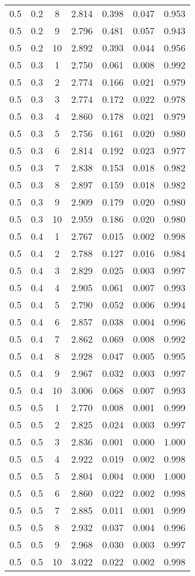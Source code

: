 \begin{tabular}{|c|c|c|c|c|c|c|}
0.5 & 0.2 & 8 & 2.814 & 0.398 & 0.047 & 0.953 \\
0.5 & 0.2 & 9 & 2.796 & 0.481 & 0.057 & 0.943 \\
0.5 & 0.2 & 10 & 2.892 & 0.393 & 0.044 & 0.956 \\
0.5 & 0.3 & 1 & 2.750 & 0.061 & 0.008 & 0.992 \\
0.5 & 0.3 & 2 & 2.774 & 0.166 & 0.021 & 0.979 \\
0.5 & 0.3 & 3 & 2.774 & 0.172 & 0.022 & 0.978 \\
0.5 & 0.3 & 4 & 2.860 & 0.178 & 0.021 & 0.979 \\
0.5 & 0.3 & 5 & 2.756 & 0.161 & 0.020 & 0.980 \\
0.5 & 0.3 & 6 & 2.814 & 0.192 & 0.023 & 0.977 \\
0.5 & 0.3 & 7 & 2.838 & 0.153 & 0.018 & 0.982 \\
0.5 & 0.3 & 8 & 2.897 & 0.159 & 0.018 & 0.982 \\
0.5 & 0.3 & 9 & 2.909 & 0.179 & 0.020 & 0.980 \\
0.5 & 0.3 & 10 & 2.959 & 0.186 & 0.020 & 0.980 \\
0.5 & 0.4 & 1 & 2.767 & 0.015 & 0.002 & 0.998 \\
0.5 & 0.4 & 2 & 2.788 & 0.127 & 0.016 & 0.984 \\
0.5 & 0.4 & 3 & 2.829 & 0.025 & 0.003 & 0.997 \\
0.5 & 0.4 & 4 & 2.905 & 0.061 & 0.007 & 0.993 \\
0.5 & 0.4 & 5 & 2.790 & 0.052 & 0.006 & 0.994 \\
0.5 & 0.4 & 6 & 2.857 & 0.038 & 0.004 & 0.996 \\
0.5 & 0.4 & 7 & 2.862 & 0.069 & 0.008 & 0.992 \\
0.5 & 0.4 & 8 & 2.928 & 0.047 & 0.005 & 0.995 \\
0.5 & 0.4 & 9 & 2.967 & 0.032 & 0.003 & 0.997 \\
0.5 & 0.4 & 10 & 3.006 & 0.068 & 0.007 & 0.993 \\
0.5 & 0.5 & 1 & 2.770 & 0.008 & 0.001 & 0.999 \\
0.5 & 0.5 & 2 & 2.825 & 0.024 & 0.003 & 0.997 \\
0.5 & 0.5 & 3 & 2.836 & 0.001 & 0.000 & 1.000 \\
0.5 & 0.5 & 4 & 2.922 & 0.019 & 0.002 & 0.998 \\
0.5 & 0.5 & 5 & 2.804 & 0.004 & 0.000 & 1.000 \\
0.5 & 0.5 & 6 & 2.860 & 0.022 & 0.002 & 0.998 \\
0.5 & 0.5 & 7 & 2.885 & 0.011 & 0.001 & 0.999 \\
0.5 & 0.5 & 8 & 2.932 & 0.037 & 0.004 & 0.996 \\
0.5 & 0.5 & 9 & 2.968 & 0.030 & 0.003 & 0.997 \\
0.5 & 0.5 & 10 & 3.022 & 0.022 & 0.002 & 0.998 \\
\hline
\end{tabular}
